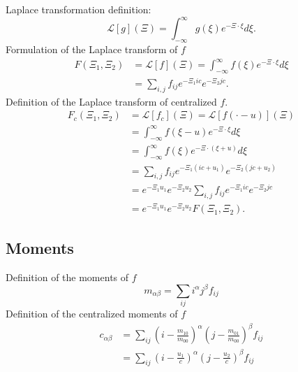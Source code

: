 \documentclass{article}
\begin{document}
Laplace transformation definition:
\begin{equation}
  \label{eq:Definition of Laplace}
  \mathcal{L}[g](\Xi) = \int_{-\infty}^\infty g(\xi) e^{-\Xi \cdot \xi}d\xi.
\end{equation}
%
Formulation of the Laplace transform of $f$
\begin{equation}
  \label{eq:Definition of F}
  \begin{aligned}
    F(\Xi_1, \Xi_2) & = \mathcal{L}[f](\Xi) = \int_{-\infty}^\infty f(\xi) e^{-\Xi \cdot \xi}d\xi \\
     & = \sum_{i,j}f_{ij} e^{-\Xi_1 ic} e^{-\Xi_2 jc}.
  \end{aligned}
\end{equation}
%
Definition of the Laplace transform of centralized $f$.
\begin{equation}
  \label{eq:Definition of centralized F}
  \begin{aligned}
    F_c(\Xi_1, \Xi_2) & = \mathcal{L}[f_c](\Xi) = \mathcal{L}[f(\cdot - u)](\Xi) \\
    & = \int_{-\infty}^\infty f(\xi-u) e^{-\Xi \cdot \xi}d\xi \\
    & = \int_{-\infty}^\infty f(\xi) e^{-\Xi \cdot (\xi+u)}d\xi \\
    & = \sum_{i,j}f_{ij} e^{-\Xi_1 (ic+u_1)} e^{-\Xi_2 (jc+u_2)} \\
    & = e^{-\Xi_1 u_1}e^{-\Xi_2 u_2}\sum_{i,j}f_{ij} e^{-\Xi_1 ic} e^{-\Xi_2 jc}\\
    & = e^{-\Xi_1 u_1}e^{-\Xi_2 u_2} F(\Xi_1, \Xi_2).
  \end{aligned}
\end{equation}
%
\subsection{Moments}
\label{sub:Moments}

Definition of the moments of $f$
\begin{equation}
  \label{eq:Definition of moments}
  m_{\alpha\beta} = \sum_{ij} i^\alpha j^\beta f_{ij}
\end{equation}
%
Definition of the centralized moments of $f$
\begin{equation}
  \begin{aligned}
    \label{eq:Definition of centralized moments}
    c_{\alpha\beta} & = \sum_{ij} {\left(i-\frac{m_{10}}{m_{00}}\right)}^\alpha {\left(j-\frac{m_{01}}{m_{00}}\right)}^\beta f_{ij} \\
    & = \sum_{ij} {\left(i-\frac{u_1}{c}\right)}^\alpha {\left(j-\frac{u_2}{c}\right)}^\beta f_{ij}
  \end{aligned}
\end{equation}
\end{document}
